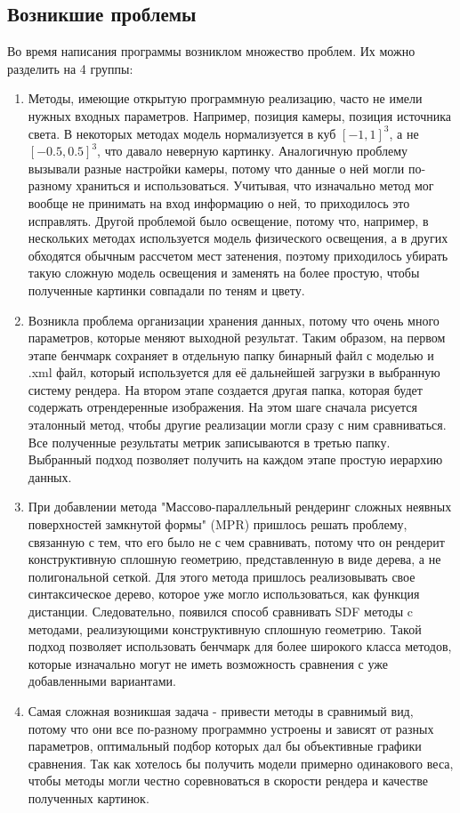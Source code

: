 \documentclass[a4paper,hidelinks,12pt]{article}
\begin{document}
\subsection{Возникшие проблемы}

Во время написания программы возниклом множество проблем. Их можно разделить на 4 группы:

\begin{enumerate}
	\item Методы, имеющие открытую программную реализацию, часто не имели нужных входных параметров. Например, позиция камеры, позиция источника света. В некоторых методах 
	модель нормализуется в куб $[-1, 1]^3$, а не $[-0.5, 0.5]^3$, что давало неверную картинку. Аналогичную проблему вызывали разные настройки камеры, потому что 
	данные о ней могли по-разному храниться и использоваться. Учитывая, что изначально метод мог вообще не принимать на вход информацию о ней, то приходилось 
	это исправлять. Другой проблемой было освещение, потому что, например, в нескольких методах используется модель физического освещения, а в других 
	обходятся обычным рассчетом мест затенения, поэтому приходилось убирать такую сложную модель освещения и заменять на более простую, чтобы полученные картинки 
	совпадали по теням и цвету. 
	\item Возникла проблема организации хранения данных, потому что очень много параметров, которые меняют выходной результат. Таким образом, на первом этапе 
	бенчмарк сохраняет в отдельную папку бинарный файл с моделью и .xml файл, который используется для её дальнейшей загрузки в выбранную систему рендера. На втором этапе создается 
	другая папка, которая будет содержать отрендеренные изображения. На этом шаге сначала рисуется эталонный метод, чтобы другие реализации могли сразу с ним 
	сравниваться. Все полученные результаты метрик записываются в третью папку. Выбранный подход позволяет получить на каждом этапе простую иерархию данных.
	\item При добавлении метода "Массово-параллельный рендеринг сложных неявных поверхностей замкнутой формы" (MPR) пришлось решать проблему, связанную с тем, 
	что его было не с чем сравнивать, потому что он рендерит конструктивную сплошную геометрию, представленную в виде дерева, а не полигональной сеткой. Для этого метода пришлось 
	реализовывать свое синтаксическое дерево, которое уже могло использоваться, как функция дистанции. Следовательно, появился способ сравнивать SDF методы c 
	методами, реализующими конструктивную сплошную геометрию. Такой подход позволяет использовать бенчмарк для более широкого класса методов, которые изначально 
	могут не иметь возможность сравнения с уже добавленными вариантами.
	\item Самая сложная возникшая задача - привести методы в сравнимый вид, потому что они все по-разному программно устроены и зависят от разных параметров, 
	оптимальный подбор которых дал бы объективные графики сравнения. Так как хотелось бы получить модели примерно одинакового веса, чтобы методы могли 
	честно соревноваться в скорости рендера и качестве полученных картинок.
\end{enumerate}
\end{document}

